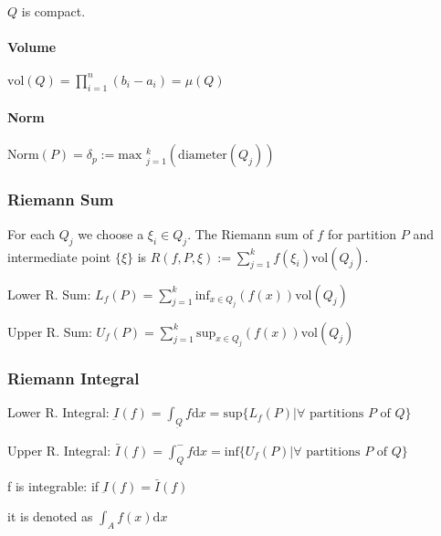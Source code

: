 \begin{compactitem}
    \item $Q$ is compact.
\end{compactitem}

\paragraph{Volume}
$\text{vol}(Q) = \prod_{i = 1}^n (b_i - a_i) = \mu(Q) $

\paragraph{Norm}
$\text{Norm}(P) = \delta_p := \text{max }_{j = 1}^k(\text{diameter}(Q_j))$

\subsubsection{Riemann Sum}
For each $Q_j$ we choose a $\xi_i \in Q_j$. The Riemann sum of $f$ for partition $P$ and intermediate point $\{\xi\}$ is $R(f, P, \xi) := \sum_{j=1}^{k} f(\xi_i) \text{vol}(Q_j)$.

\begin{compactdesc}
    \item[Lower R. Sum:] $L_f(P) = \sum_{j=1}^{k} \text{inf}_{x \in Q_j} (f(x)) \text{vol}(Q_j)$
    \item[Upper R. Sum:] $U_f(P) = \sum_{j=1}^{k} \text{sup}_{x \in Q_j} (f(x)) \text{vol}(Q_j)$
\end{compactdesc}

\subsubsection{Riemann Integral}
\begin{compactdesc}
    \item[Lower R. Integral:] $\underbar{I}(f) = \int_{\underbar{Q}} f \mathrm{d}x = \text{sup}\{L_f(P) | \forall \text{ partitions } P \text{ of } Q\}$
    \item[Upper R. Integral:] $\bar{I}(f) = \int_{Q}^{-} f \mathrm{d}x = \text{inf}\{U_f(P) | \forall \text{ partitions } P \text{ of } Q\}$
    \item[f is integrable:] if $\underbar{I}(f) = \bar{I}(f)$
        \begin{compactitem}
            \item it is denoted as $\int_{A} f(x) \mathrm{d}x$
        \end{compactitem}
\end{compactdesc}

